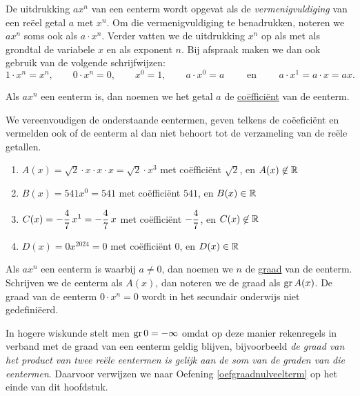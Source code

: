 \documentclass{ximera}
\begin{document}
De uitdrukking \( ax^n \) van een eenterm wordt opgevat als de {\em vermenigvuldiging} van een re\"eel getal \( a \) met \( x^n \). Om die vermenigvuldiging te benadrukken, noteren we \( ax^n \) soms ook als \( a \cdot x^n \). Verder vatten we de uitdrukking \( x^n \) op als  met als grondtal de variabele \( x \) en als exponent \( n \). Bij afspraak maken we dan ook gebruik van de volgende schrijfwijzen:
\[
1\cdot x^n = x^n, \qquad
0\cdot x^n = 0, \qquad  
x^0 = 1, \qquad 
a\cdot x^0 = a \qquad \text{ en } \qquad 
a\cdot x^1 = a \cdot x = ax.
\]

Als \( ax^n \) een eenterm is, dan noemen we het getal \( a \) de \underline{co\"effici\"ent} van de eenterm.

\begin{example}
We vereenvoudigen de onderstaande eentermen, geven telkens de co\"eefici\"ent en vermelden ook of de eenterm al dan niet behoort tot de verzameling van de re\"ele getallen.
\begin{enumerate}

\item
\( A(x) = \sqrt{2}\cdot x \cdot x \cdot x = \sqrt{2}\cdot x^3 \) met co\"effici\"ent \( \sqrt{2} \), en \( A(x) \not\in \mathbb{R} \)
\item
\( B(x) = 541x^0 = 541 \) met co\"effici\"ent \( 541 \), en \( B(x) \in \mathbb{R} \) 
\item
\( \displaystyle C(x) = -\frac{4}{7}\,x^1 = -\frac{4}{7}\,x \) met co\"effici\"ent \( \displaystyle -\frac{4}{7} \), en \( C(x) \not\in \mathbb{R} \)
\item
\( D(x) = 0 x^{2024} = 0 \) met co\"effici\"ent \( 0 \), en \( D(x) \in \mathbb{R} \) 
\end{enumerate}
\end{example}

Als \( ax^n \) een eenterm is waarbij \( a \neq 0 \), dan noemen we \( n \) de \underline{graad} van de eenterm. Schrijven we de eenterm als \( A(x) \), dan noteren we de graad als \( \operatorname{gr} A(x) \). De graad van de eenterm \( 0\cdot x^n = 0 \) wordt in het secundair onderwijs niet gedefini\"eerd.

\medskip

\begin{Uitbreiding}
In hogere wiskunde stelt men \( \operatorname{gr} 0 = - \infty \) omdat op deze manier rekenregels in verband met de graad van een eenterm geldig blijven, bijvoorbeeld 
{\em de graad van het product van twee re\"ele eentermen is gelijk aan de som van de graden van die eentermen}. Daarvoor verwijzen we naar Oefening \ref{oefgraadnulveelterm} op het einde van dit hoofdstuk.
\end{Uitbreiding}
\end{document}
